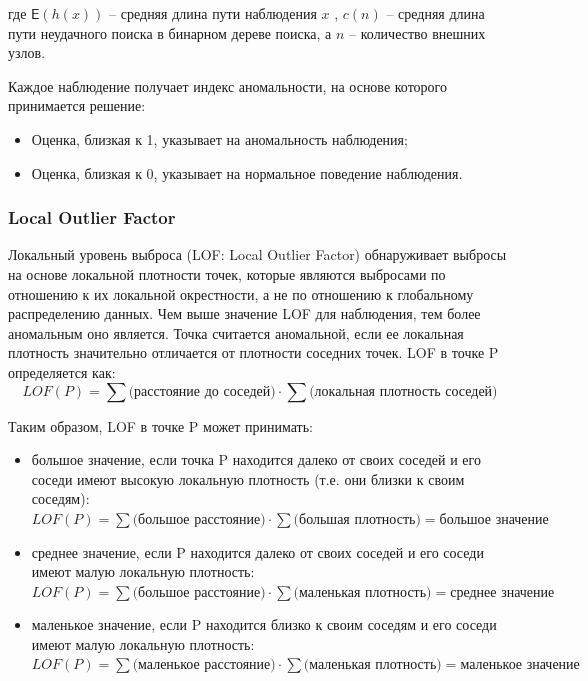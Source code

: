 \documentclass[12pt]{article}
\begin{document}
    \noindent где $\mathsf{E}(h(x))$ -- средняя длина пути наблюдения $x$ , $c(n)$ -- средняя длина пути неудачного поиска в бинарном дереве поиска, а $n$ -- количество внешних узлов.

    \par Каждое наблюдение получает индекс аномальности, на основе которого принимается решение:
    \begin{itemize}
        \item Оценка, близкая к 1, указывает на аномальность наблюдения;
        \item Оценка, близкая к 0, указывает на нормальное поведение наблюдения.
    \end{itemize}


    \subsubsection{Local Outlier Factor}
    \label{sec:Research:Model:LocalOutlierFactor}

    \par Локальный уровень выброса (LOF: Local Outlier Factor) \cite{LOF} обнаруживает выбросы на основе локальной плотности точек, которые являются выбросами по отношению к их локальной окрестности, а не по отношению к глобальному распределению данных. Чем выше значение LOF для наблюдения, тем более аномальным оно является. Точка считается аномальной, если ее локальная плотность значительно отличается от плотности соседних точек. LOF в точке P определяется как:
    \begin{equation}
    \label{sec:Research:Model:LocalOutlierFactor:formula:LOF}
        LOF(P) = \sum \text{(расстояние до соседей)} \cdot \sum \text{(локальная плотность соседей)}
    \end{equation}

    \noindent Таким образом, LOF в точке P может принимать:

    \begin{itemize}
        \item большое значение, если точка P находится далеко от своих соседей и его соседи имеют высокую локальную плотность (т.е. они близки к своим соседям): \\ 
        $ LOF(P) = \sum {\text{(большое расстояние)}} \cdot \sum \text{(большая плотность)} = \text{большое значение}$
        \item среднее значение, если P находится далеко от своих соседей и его соседи имеют малую локальную плотность: \\
        $ LOF(P) = \sum \text{(большое расстояние)} \cdot \sum \text{(маленькая плотность)} = \text{среднее значение} $
        \item маленькое значение, если P находится близко к своим соседям и его соседи имеют малую локальную плотность: \\
        $ LOF(P) = \sum \text{(маленькое расстояние)} \cdot \sum \text{(маленькая плотность)} = \text{маленькое значение} $
    \end{itemize}
\end{document}
